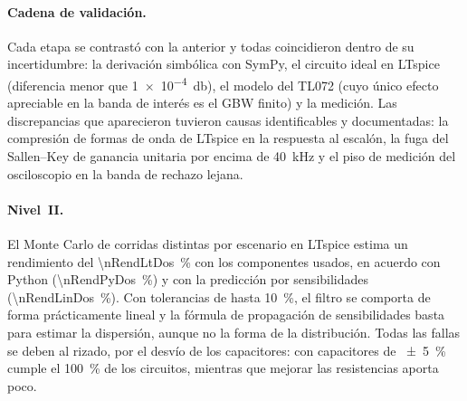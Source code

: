 \paragraph{Cadena de validación.} Cada etapa se contrastó con la anterior y todas coincidieron dentro de su incertidumbre: la derivación simbólica
con SymPy, el circuito ideal en LTspice (diferencia menor que \qty{1e-4}{\decibel}), el modelo del TL072 (cuyo único efecto apreciable en la
banda de interés es el GBW finito) y la medición. Las discrepancias que aparecieron tuvieron causas identificables y documentadas: la compresión de
formas de onda de LTspice en la respuesta al escalón, la fuga del Sallen--Key de ganancia unitaria por encima de \qty{40}{\kilo\hertz} y el piso
de medición del osciloscopio en la banda de rechazo lejana.

\paragraph{Nivel~II.} El Monte Carlo de \nNRun{} corridas distintas por escenario en LTspice estima un rendimiento del \qty{\nRendLtDos}{\percent}
con los componentes usados, en acuerdo con Python (\qty{\nRendPyDos}{\percent}) y con la predicción por sensibilidades
(\qty{\nRendLinDos}{\percent}). Con tolerancias de hasta \qty{10}{\percent}, el filtro se comporta de forma prácticamente lineal y la fórmula de
propagación de sensibilidades basta para estimar la dispersión, aunque no la forma de la distribución. Todas las fallas se deben al rizado, por
el desvío de los capacitores: con capacitores de \qty{\pm 5}{\percent} cumple el \qty{100}{\percent} de los circuitos, mientras que mejorar las
resistencias aporta poco.

